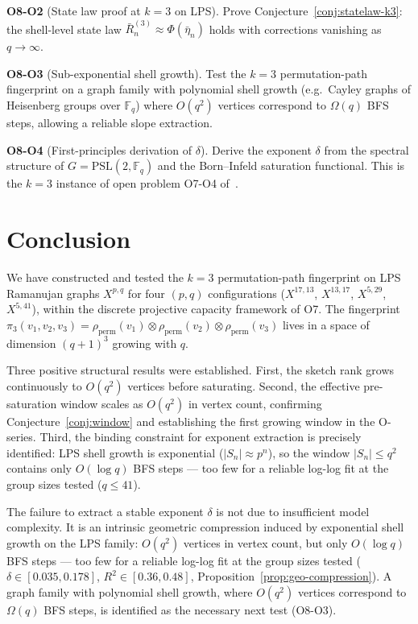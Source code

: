 \documentclass[11pt,a4paper]{article}
\theoremstyle{definition}
\theoremstyle{remark}
\newcommand{\F}{\mathbb{F}}
\newcommand{\PSL}{\mathrm{PSL}}
\newcommand{\perm}{\mathrm{perm}}
\begin{document}
    \medskip
    \noindent
    \textbf{O8-O2} (State law proof at $k=3$ on LPS).
    Prove Conjecture~\ref{conj:statelaw-k3}: the shell-level state law
    $\bar R_n^{(3)} \approx \Phi(\bar\eta_n)$ holds with corrections vanishing as $q \to \infty$.

    \medskip
    \noindent
    \textbf{O8-O3} (Sub-exponential shell growth).
    Test the $k=3$ permutation-path fingerprint on a graph family with polynomial
    shell growth (e.g.\ Cayley graphs of Heisenberg groups over $\mathbb{F}_q$) where
    $O(q^2)$ vertices correspond to $\Omega(q)$ BFS steps, allowing a reliable
    slope extraction.

    \medskip
    \noindent
    \textbf{O8-O4} (First-principles derivation of $\delta$).
    Derive the exponent $\delta$ from the spectral structure of $G = \PSL(2, \F_q)$
    and the Born--Infeld saturation functional.
    This is the $k=3$ instance of open problem O7-O4 of~\cite{Beau2026a11}.

  \section{Conclusion}
  \label{sec:conclusion}

  We have constructed and tested the $k=3$ permutation-path fingerprint on LPS
  Ramanujan graphs $X^{p,q}$ for four $(p,q)$ configurations
  ($X^{17,13}$, $X^{13,17}$, $X^{5,29}$, $X^{5,41}$),
  within the discrete projective capacity framework of O7.
  The fingerprint $\pi_3(v_1,v_2,v_3) = \rho_\perm(v_1) \otimes \rho_\perm(v_2)
  \otimes \rho_\perm(v_3)$ lives in a space of dimension $(q+1)^3$ growing with $q$.

  Three positive structural results were established.
  First, the sketch rank grows continuously to $O(q^2)$ vertices before saturating.
  Second, the effective pre-saturation window scales as $O(q^2)$ in vertex count,
  confirming Conjecture~\ref{conj:window} and establishing the first growing window
  in the O-series.
  Third, the binding constraint for exponent extraction is precisely identified:
  LPS shell growth is exponential ($|S_n| \approx p^n$), so the window
  $|S_n| \leq q^2$ contains only $O(\log q)$ BFS steps --- too few for a reliable
  log-log fit at the group sizes tested ($q \leq 41$).

  The failure to extract a stable exponent $\delta$ is not due to insufficient
  model complexity.
  It is an intrinsic geometric compression induced by exponential shell growth
  on the LPS family: $O(q^2)$ vertices in vertex count, but only $O(\log q)$
  BFS steps — too few for a reliable log-log fit at the group sizes tested
  ($\delta \in [0.035, 0.178]$, $R^2 \in [0.36, 0.48]$, Proposition~\ref{prop:geo-compression}).
  A graph family with polynomial shell growth, where $O(q^2)$ vertices correspond
  to $\Omega(q)$ BFS steps, is identified as the necessary next test (O8-O3).
\end{document}
